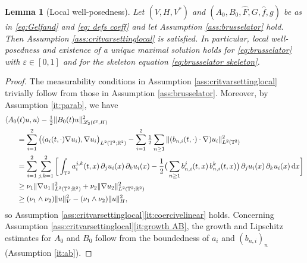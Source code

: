 \documentclass{amsart}
\newcommand{\dd}{\,\mathrm{d}}
\newcommand{\<}{\langle}
\newcommand{\?}{\rangle}
\newcommand{\Tor}{\mathbb{T}}
\renewcommand{\Tor}{\mathbb{T}^2}
\theoremstyle{plain}
\theoremstyle{remark}
\theoremstyle{plain}
\newtheorem{lemma}[theorem]{Lemma}
\numberwithin{equation}{section}
\def\R{{\mathbb R}}
\newcommand{\eps}{\varepsilon}
\begin{document}
\begin{lemma}[Local well-posedness]\label{lem:bruss loc}
Let $(V,H,V^*)$ and $(A_0,B_0,\hat{F},G,\hat{f},g)$  be as in  \eqref{eq:Gelfand} and  \eqref{eq: defs coeff} and let Assumption \ref{ass:brusselator} hold. Then Assumption \ref{ass:critvarsettinglocal} is satisfied. In particular, local well-posedness and existence of a unique maximal solution holds for \eqref{eq:brusselator} with $\eps\in[0,1]$ and for the skeleton equation \eqref{eq:brusselator skeleton}. 
\end{lemma}

\begin{proof}
The measurability conditions in Assumption \ref{ass:critvarsettinglocal} trivially follow from those in Assumption \ref{ass:brusselator}. Moreover, by Assumption \ref{it:parab}, we have
\begin{align}
\langle A_0&(t)u,u\rangle 
-\tfrac{1}{2}\|B_0(t)u\|_{\mathscr{L}_2(\ell^2,H)}^2 \notag\\
&=\sum_{i=1}^2 \big(  (a_i(t,\cdot)\nabla u_i),\nabla u_i\big)_{L^2(\Tor;\R^2)}
-\sum_{i=1}^2\tfrac{1}{2}\sum_{n\geq 1}\|(b_{n,i}(t,\cdot)\cdot\nabla)u_i\|_{L^2(\Tor)}^2   \notag\\
&=\sum_{i=1}^2\sum_{j,k=1}^{2}\bigg[\int_{\Tor}  a_{i}^{j,k}(t,x)\,\partial_j u_i(x)\,\partial_k u_i(x) -\frac{1}{2} \big( \sum_{n \geq 1} b_{n,i}^{j}(t,x)\, b_{n,i}^{k}(t,x) \big)
\, \partial_j u_i(x)\, \partial_k u_i(x) \dd x \bigg]\notag\\
&\geq \nu_1\|\nabla u_1\|_{L^2(\Tor;\R^2)}^2+\nu_2\|\nabla u_2\|_{L^2(\Tor;\R^2)}^2  \label{eq:linearcoerbrusselator}\\
&\geq (\nu_1\wedge \nu_2)\|u\|_{V}^2-(\nu_1\wedge \nu_2)\|u\|_{H}^2, \notag 
\end{align}  
so Assumption \ref{ass:critvarsettinglocal}\ref{it:coercivelinear} holds. Concerning Assumption \ref{ass:critvarsettinglocal}\ref{it:growth AB}, the growth and Lipschitz estimates for $A_0$ and $B_0$ follow  from the boundedness of $a_i$ and $(b_{n,i})_n$ (Assumption \ref{it:ab}). 


\end{proof}
\end{document}
